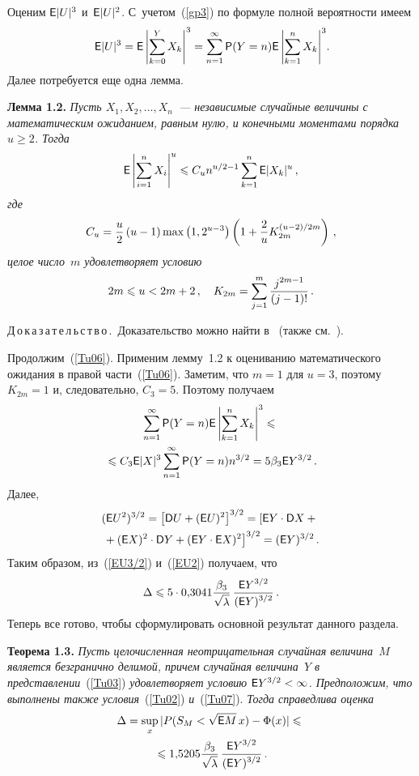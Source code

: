 \begin{multicols}{2}
Оценим ${\sf E} |U|^3$ и~${\sf E} |U|^2$. С~учетом~(\ref{gp3}) по формуле
полной вероятности имеем
\begin{equation}
\! {\sf E}
|U|^3={\sf E}\left|\sum_{k=0}^YX_k\right|^3=\sum\limits_{n=1}^\infty
{\sf P}(Y=n){\sf E}\left|\sum\limits_{k=1}^n X_k\right|^3\!.\!\!
\label{Tu06}
\end{equation}
Далее потребуется еще одна лемма.
\pagebreak


\noindent
\textbf{Лемма 1.2.} \textit{Пусть $X_1,X_2,\ldots,X_n$~--- независимые случайные величины с
математическим ожиданием, равным нулю, и конечными моментами
порядка $u\geqslant2$. Тогда
$$
{\sf E} \left|\sum\limits_{i=1}^n X_i\right|^u\leqslant C_un^{u/2-1}\sum\limits_{k=1}^n {\sf E}
|X_k|^u\,,
$$ 
где
$$
C_u={\displaystyle\frac{\displaystyle u\mathstrut}{\displaystyle 2\mathstrut}}\left(u-1\right)\max\left(1,2^{u-3}\right)\left(1+{\displaystyle\frac{\displaystyle 2\mathstrut}{\displaystyle u\mathstrut}}K_{2m}^{(u-2)/2m}\right)\,,
$$
целое число~$m$ удовлетворяет условию} 
$$
2m\leqslant u<2m+2\,,\quad K_{2m}=\sum\limits_{j=1}^m \displaystyle\frac{\displaystyle j^{2m-1}\mathstrut}{\displaystyle (j-1)!\mathstrut}\,.
$$


\medskip

\noindent
Д\,о\,к\,а\,з\,а\,т\,е\,л\,ь\,с\,т\,в\,о\,.\ Доказательство можно найти в~\cite{9g} (также см.~\cite{10g}).

\medskip

Продолжим~(\ref{Tu06}). Применим лемму~1.2 к оцениванию
математического ожидания в правой час\-ти~(\ref{Tu06}). Заметим, что
$m=1$ для $u=3$, поэтому $K_{2m}=1$ и, следовательно, $C_3=5$.
Поэтому получаем
\begin{multline}
 \sum\limits_{n=1}^\infty {\sf P}(Y=n) {\sf E}
\left|\sum\limits_{k=1}^n X_k\right|^3 \leqslant{}\\
{}\leqslant  C_3 {\sf E}
|X|^3\sum\limits_{n=1}^\infty {\sf P}(Y=n)n^{3/2}=5 \beta_3{\sf E} Y^{3/2}\,.
\label{EU3/2}
\end{multline}
Далее,
\begin{multline}
({\sf E} U^2)^{3/2}=\left[{\sf D} U+({\sf E} U)^2\right]^{3/2}=\left[{\sf E}
Y\cdot{\sf D} X +{}\right.\\
\left.{}+({\sf E} X)^2\cdot{\sf D} Y+({\sf E} Y\cdot{\sf E} X)^2\right]^{3/2}=({\sf E}
Y)^{3/2}\,.
\label{EU2}
\end{multline}
Таким образом, из~(\ref{EU3/2}) и~(\ref{EU2}) получаем, что
$$
\Delta \leqslant 5\cdot
0{,}3041\displaystyle\frac{\displaystyle \beta_3\mathstrut}{\displaystyle \sqrt{\lambda}\mathstrut}\,\displaystyle\frac{\displaystyle {\sf E}
Y^{3/2}\mathstrut}{\displaystyle ({\sf E} Y)^{3/2}\mathstrut}\,.
$$
Теперь все готово, чтобы сформулировать основной результат данного
раздела.

\medskip

\noindent
\textbf{Теорема 1.3.} \textit{Пусть целочисленная неотрицательная случайная величина~$M$
является безгранично делимой, причем случайная величина~$Y$ в
представлении}~(\ref{Tu03}) \textit{удов\-ле\-тво\-ря\-ет условию ${\sf E}
Y^{3/2}<\infty$. Предположим, что выполнены также условия}~(\ref{Tu02}) 
\textit{и}~(\ref{Tu07}). \textit{Тогда справедлива оценка}
\begin{multline}
 \Delta = \sup\limits_{x}|P(S_{M}<\sqrt{{\sf E}
M}\,x)-\Phi(x)| \leqslant{}\\
{}\leqslant
1{,}5205\displaystyle\frac{\displaystyle \beta_3\mathstrut}{\displaystyle \sqrt{\lambda}\mathstrut}\,\displaystyle\frac{\displaystyle {\sf E}
Y^{3/2}\mathstrut}{\displaystyle ({\sf E} Y)^{3/2}\mathstrut}\,.
\label{Tu036}
\end{multline}



\end{multicols}
